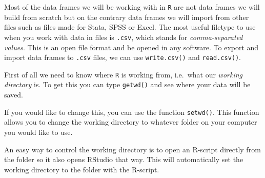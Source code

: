 \documentclass[12pt,oneside]{reedthesis}
\theoremstyle{definition}
\theoremstyle{definition}
\theoremstyle{definition}
\theoremstyle{remark}
\begin{document}
  Most of the data frames we will be working with in \texttt{R} are not
  data frames we will build from scratch but on the contrary data frames
  we will import from other files such as files made for Stata, SPSS or
  Excel. The most useful filetype to use when you work with data in files
  is \texttt{.csv}, which stands for \emph{comma-separated values}. This
  is an open file format and be opened in any software. To export and
  import data frames to \texttt{.csv} files, we can use
  \texttt{write.csv()} and \texttt{read.csv()}.
  
  First of all we need to know where \texttt{R} is working from, i.e.~what
  our \emph{working directory} is. To get this you can type
  \texttt{getwd()} and see where your data will be saved.
  \begin{Shaded}
  \begin{Highlighting}[]
  \NormalTok{()}
  \end{Highlighting}
  \end{Shaded}
  If you would like to change this, you can use the function
  \texttt{setwd()}. This function allows you to change the working
  directory to whatever folder on your computer you would like to use.
  \begin{Shaded}
  \begin{Highlighting}[]
  \NormalTok{(}\NormalTok{)}
  \end{Highlighting}
  \end{Shaded}
  An easy way to control the working directory is to open an R-script
  directly from the folder so it also opens RStudio that way. This will
  automatically set the working directory to the folder with the R-script.
  
\end{document}

